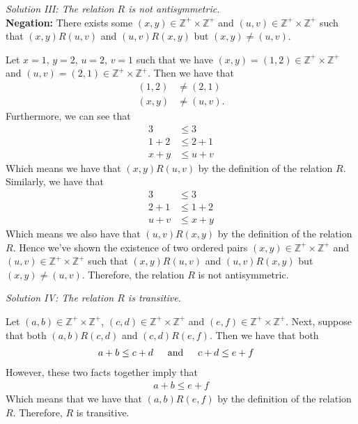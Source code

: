 \documentclass[11pt, letterpaper]{article}
\begin{document}
{\noindent\large\it Solution III: The relation $R$ is not antisymmetric.}\\[0.25cm]
{\bf Negation:} There exists some $(x,y)\in\mathbb{Z^+}\times\mathbb{Z^+}$ and $(u,v)\in\mathbb{Z^+}\times\mathbb{Z^+}$ such that $(x,y)R(u,v)$ and $(u,v)R(x,y)$ but $(x,y)\neq (u,v)$.
\begin{prf}
    Let $x=1$, $y=2$, $u=2$, $v=1$ such that we have $(x,y)=(1,2)\in\mathbb{Z^+}\times\mathbb{Z^+}$ and $(u,v)=(2,1)\in\mathbb{Z^+}\times\mathbb{Z^+}$. Then we have that
    \begin{align*}
        (1,2)&\neq (2,1)\\
        (x,y)&\neq (u,v).
    \end{align*}
    Furthermore, we can see that
    \begin{align*}
        3&\leq 3\\
        1+2&\leq 2+1\\
        x+y&\leq u+v
    \end{align*}
    Which means we have that $(x,y)R(u,v)$ by the definition of the relation $R$. Similarly, we have that
    \begin{align*}
        3&\leq 3\\
        2+1&\leq 1+2\\
        u+v&\leq x+y
    \end{align*}
    Which means we also have that $(u,v)R(x,y)$ by the definition of the relation $R$. Hence we've shown the existence of two ordered pairs $(x,y)\in\mathbb{Z^+}\times\mathbb{Z^+}$ and $(u,v)\in\mathbb{Z^+}\times\mathbb{Z^+}$ such that $(x,y)R(u,v)$ and $(u,v)R(x,y)$ but $(x,y)\neq (u,v)$.
    Therefore, the relation $R$ is not antisymmetric. 
\end{prf}
{\noindent\large\it Solution IV: The relation $R$ is transitive.}
\begin{prf}
    Let $(a,b)\in\mathbb{Z^+}\times\mathbb{Z^+}$, $(c,d)\in\mathbb{Z^+}\times\mathbb{Z^+}$ and $(e,f)\in\mathbb{Z^+}\times\mathbb{Z^+}$. Next, suppose that both $(a,b)R(c,d)$ and $(c,d)R(e,f)$. Then we have that both
    \begin{align*}
        a+b\leq c+d \indent&\text{and}\indent c+d\leq e+f
    \end{align*}
    However, these two facts together imply that
    \begin{align*}
        a+b\leq e+f
    \end{align*}
    Which means that we have that $(a,b)R(e,f)$ by the definition of the relation $R$. Therefore, $R$ is transitive.
\end{prf}
\end{document}
